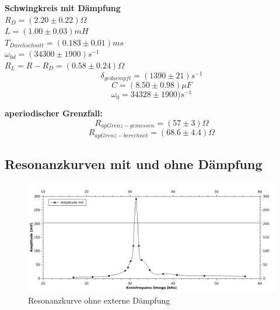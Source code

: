 \documentclass[12pt,a4paper]{article}
\begin{document}
\begin{multicols}{2}


\noindent \textbf{Schwingkreis mit Dämpfung}\\

\noindent $R_D = (2.20\pm 0.22)\Omega$\\
$L=(1.00 \pm 0.03)mH$\\
$T_{Durchschnitt}%
= (0.183  \pm 0.01) ms$\\
$\omega_{0d} = (34300 \pm 1900)s^{-1}$\\
$R_L = R-R_D = (0.58 \pm 0.24)\Omega$ 
$$\delta_{gedaempft} = (1390 \pm 21)s^{-1}$$
$$C = (8.50 \pm 0.98)\mu F$$
$$\omega_{0} = 34328 \pm 1900)s^{-1}$$


\noindent \textbf{aperiodischer Grenzfall:}
$$R_{apGrenz-gemessen} = (57\pm 3)\Omega$$
$$R_{apGrenz-berechnet}=(68.6 \pm 4.4)\Omega$$






\pagebreak
\subsection{Resonanzkurven mit und ohne Dämpfung}


\end{multicols}
\begin{figure}[H]
	\centering
	\includegraphics[scale=1.2]{./figure/resonanz_ohne_ext_daempf.png}
	\caption{Resonanzkurve ohne externe Dämpfung}
	\label{fig:resonanz_ohne}
\end{figure}
\end{document}
